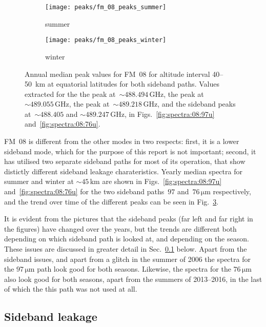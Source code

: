 \begin{figure}[ht]
    \centering
    \begin{subfigure}[b]{0.9545\textwidth}
        \texttt{[image: peaks/fm\_08\_peaks\_summer]}
        \caption{summer}\label{fig:peaks:08:summer}
    \end{subfigure}
    \begin{subfigure}[b]{0.9545\textwidth}
        \texttt{[image: peaks/fm\_08\_peaks\_winter]}
        \caption{winter}\label{fig:peaks:08:winter}
    \end{subfigure}
    \caption{Annual median peak values for FM~08 for altitude interval
        40--50~km at equatorial latitudes for both sideband paths.
        Values extracted for the the  peak
        at~$\sim488.494\,\mathrm{GHz}$, the  peak
        at~$\sim489.055\,\mathrm{GHz}$, the  peak
        at~$\sim489.218\,\mathrm{GHz}$, and the  sideband peaks
        at~$\sim488.405$ and $\sim489.247\,\mathrm{GHz}$,
        in Figs.~\ref{fig:spectra:08:97u} and~\ref{fig:spectra:08:76u}.
        }\label{fig:peaks:08}
\end{figure}

\noindent
FM~08 is different from the other modes in two respects: first, it is a lower
sideband mode, which for the purpose of this report is not important; second,
it has utilised two separate sideband paths for most of its operation, that
show distictly different sideband leakage charateristics.  Yearly median
spectra for summer and winter at $\sim45\,\mathrm{km}$ are shown in
Figs.~\ref{fig:spectra:08:97u} and~\ref{fig:spectra:08:76u} for the two
sideband paths~$97$ and~$76\,\mathrm{\mu m}$ respectively, and the trend over
time of the different peaks can be seen in Fig.~\ref{fig:peaks:08}.

It is evident from the pictures that the sideband peaks (far left and far right
in the figures) have changed over the years, but the trends are different both
depending on which sideband path is looked at, and depending on the season.
These issues are discussed in greater detail in Sec.~\ref{FM08:sbl} below.
Apart from the sideband issues, and apart from a glitch in the summer of 2006
the spectra for the $97\,\mathrm{\mu m}$ path look good for both seasons.
Likewise, the spectra for the $76\,\mathrm{\mu m}$ also look good for both
seasons, apart from the summers of 2013--2016, in the last of which the this
path was not used at all.


\subsection{Sideband leakage}
\label{FM08:sbl}

